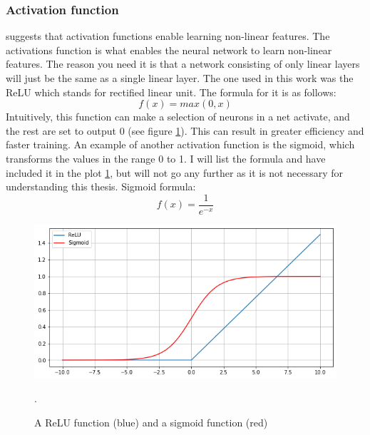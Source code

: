     \subsubsection{Activation function} \label{activation function}
        \citeauthor{razavi2021deep_exp_per} suggests that activation functions enable learning non-linear features.
        The activations function is what enables the neural network to learn non-linear features. The reason you need it is that a network consisting of only linear layers will just be the same as a single linear layer\cite{razavi2021deep_exp_per}. The one used in this work was the ReLU which stands for rectified linear unit. The formula for it is as follows:
            \begin{equation} \label{relu_eq}
                f(x) = max(0,x)
            \end{equation}
        Intuitively, this function can make a selection of neurons in a net activate, and the rest are set to output 0 (see figure \ref{activation_fig}). This can result in greater efficiency and faster training. An example of another activation function is the sigmoid, which transforms the values in the range 0 to 1. I will list the formula and have included it in the plot \ref{activation_fig}, but will not go any further as it is not necessary for understanding this thesis. Sigmoid formula:
            \begin{equation} \label{sigmoid_eq}
                f(x) = \dfrac{1}{e^{-x}} 
            \end{equation}
            
            \begin{figure}[H]
                \centering
                \includegraphics[scale=0.5]{figures/activation.png}
                \caption{A ReLU function (blue) and a sigmoid function (red)}.
              	\medskip 
                \label{activation_fig}
            \end{figure}

